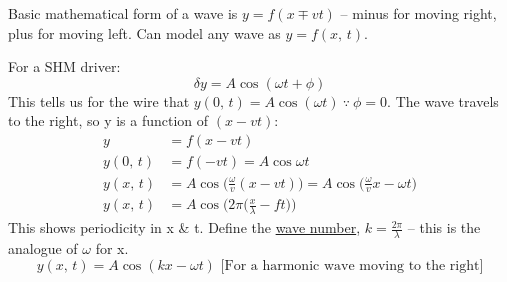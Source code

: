 \documentclass[a4paper, 11pt, normalem]{report}
\begin{document}
Basic mathematical form of a wave is $y = f(x \mp vt)$ -- minus for moving right, plus for moving left.
Can model any wave as $y = f(x,\,t)$.

For a SHM driver:
\begin{equation}
    {\delta}y = A\cos{({\omega}t + \phi)}
\end{equation}
This tells us for the wire that $y(0,\,t) = A\cos{({\omega}t)} ~\because~ \phi = 0$.
The wave travels to the right, so y is a function of $(x-vt)$:
\begin{align}
    y &= f(x-vt) \\
    y(0,\,t) &= f(-vt) = A\cos{{\omega}t} \\
    y(x,\,t) &= A\cos{\Big(\frac{\omega}{v}(x-vt)\Big)} = A\cos{\Big(\frac{\omega}{v}x - {\omega}t\Big)} \\
    y(x,\,t) &= A\cos{\Big(2\pi\Big(\frac{x}{\lambda} - ft\Big)\Big)}
\end{align}
This shows periodicity in x \& t.
Define the \underline{wave number}, $k = \frac{2\pi}{\lambda}$ -- this is the analogue of $\omega$ for x.
\begin{equation}
    y(x,\,t) = A\cos{(kx - {\omega}t)} \text{ [For a harmonic wave moving to the right]}
\end{equation}
\end{document}
